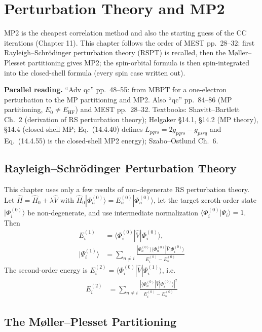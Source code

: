 \chapter{Perturbation Theory and MP2}
\label{ch:mp2}

MP2 is the cheapest correlation method and also the starting guess of the CC iterations (Chapter 11). This chapter follows the order of MEST pp.~28--32: first Rayleigh--Schrödinger perturbation theory (RSPT) is recalled, then the Møller--Plesset partitioning gives MP2; the spin-orbital formula is then spin-integrated into the closed-shell formula (every spin case written out).

\textbf{Parallel reading.} “Adv qc” pp.~48--55: from MBPT for a one-electron perturbation to the MP partitioning and MP2. Also “qc” pp.~84--86 (MP partitioning, $E_0 \neq E_{\text{HF}}$) and MEST pp.~28--32. Textbooks: Shavitt--Bartlett Ch.~2 (derivation of RS perturbation theory); Helgaker §14.1, §14.2 (MP theory), §14.4 (closed-shell MP; Eq.~(14.4.40) defines $L_{pqrs} = 2 g_{pqrs} - g_{psrq}$ and Eq.~(14.4.55) is the closed-shell MP2 energy); Szabo--Ostlund Ch.~6.

\section{Rayleigh--Schrödinger Perturbation Theory}

This chapter uses only a few results of non-degenerate RS perturbation theory. Let $\hat{H} = \hat{H}_0 + \lambda \hat{V}$ with $\hat{H}_0 |\Phi_n^{(0)}\rangle = E_n^{(0)} |\Phi_n^{(0)}\rangle$, let the target zeroth-order state $|\Phi_i^{(0)}\rangle$ be non-degenerate, and use intermediate normalization $\langle \Phi_i^{(0)} | \Psi_i \rangle = 1$. Then
\begin{align*}
E_i^{(1)} &= \langle \Phi_i^{(0)} | \hat{V} | \Phi_i^{(0)} \rangle, \\
|\Psi_i^{(1)}\rangle &= \sum_{n \neq i} \frac{|\Phi_n^{(0)}\rangle \langle \Phi_n^{(0)}|\hat{V}|\Phi_i^{(0)}\rangle}{E_i^{(0)} - E_n^{(0)}}
\end{align*}
The second-order energy is $E_i^{(2)} = \langle \Phi_i^{(0)}|\hat{V}|\Psi_i^{(1)}\rangle$, i.e.
\begin{align}\label{eq:e2-rspt}
E_i^{(2)} &= \sum_{n \neq i} \frac{|\langle \Phi_n^{(0)} | \hat{V} | \Phi_i^{(0)} \rangle|^2}{E_i^{(0)} - E_n^{(0)}}
\end{align}

\section{The Møller--Plesset Partitioning}

